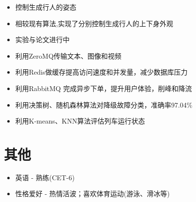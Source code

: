 \documentclass{resume}
\begin{document}
\begin{itemize}[topsep = 0 pt, partopsep = 0pt]
  \item 控制生成行人的姿态
  \item 相较现有算法,实现了分别控制生成行人的上下身外观
  \item 实验与论文进行中
\end{itemize}

\begin{itemize}[topsep = 0 pt, partopsep = 0pt]
  \item 利用ZeroMQ传输文本、图像和视频
\end{itemize}

\begin{itemize}[topsep = 0 pt, partopsep = 0pt]
  \item 利用Redis做缓存提高访问速度和并发量，减少数据库压力
  \item 利用RabbitMQ 完成异步下单，提升用户体验，削峰和降流
\end{itemize}

\begin{itemize}[topsep = 0 pt, partopsep = 0pt]
  \item 利用决策树、随机森林算法对降级故障分类，准确率97.04$\%$
  \item 利用K-means、KNN算法评估列车运行状态
\end{itemize}

\section{ 其他}
\begin{itemize}[parsep=0.5ex]
  \item  英语 - 熟练(CET-6)
  \item  性格爱好 - 热情活波；喜欢体育运动(游泳、滑冰等)
\end{itemize}
\end{document}
